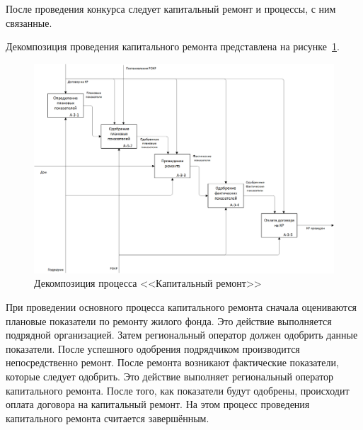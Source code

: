 После проведения конкурса следует капитальный ремонт и процессы, с ним связанные.

Декомпозиция проведения капитального ремонта представлена на рисунке~\ref{img:source-A3}.

\begin{figure}[h!]
	\begin{center}
		\begin{minipage}[h]{\linewidth}
			\centering
			\includegraphics[width=\linewidth]{images/source-A3.png}
			\caption{Декомпозиция процесса <<Капитальный ремонт>>}
			\label{img:source-A3}
		\end{minipage}
		\hfill
	\end{center}
\end{figure}

При проведении основного процесса капитального ремонта сначала оцениваются плановые показатели по ремонту жилого фонда.
Это действие выполняется подрядной организацией.
Затем региональный оператор должен одобрить данные показатели.
После успешного одобрения подрядчиком производится непосредственно ремонт.
После ремонта возникают фактические показатели, которые следует одобрить.
Это действие выполняет региональный оператор капитального ремонта.
После того, как показатели будут одобрены, происходит оплата договора на капитальный ремонт.
На этом процесс проведения капитального ремонта считается завершённым.

\clearpage
\newpage